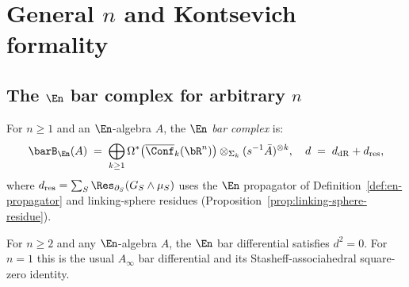 
\section{\texorpdfstring{General $n$ and Kontsevich formality}{General n and Kontsevich formality}}
\label{sec:general-n-formality}

\subsection{\texorpdfstring{The $\En$ bar complex for arbitrary $n$}{The En bar complex for arbitrary n}}

\begin{definition}
\label{def:en-bar-general}
For $n \geq 1$ and an $\En$-algebra $A$, the \emph{$\En$ bar complex}
is:
\begin{equation}\label{eq:en-bar-general}
\barB_{\En}(A)
\;=\;
\bigoplus_{k \geq 1}
\Omega^*\bigl(\overline{\Conf}_k(\bR^n)\bigr)
\otimes_{\Sigma_k} (s^{-1}\bar{A})^{\otimes k},
\quad
d \;=\; d_{\mathrm{dR}} + d_{\mathrm{res}},
\end{equation}
where $d_{\mathrm{res}} = \sum_S \Res_{\partial_S}(G_S \wedge \mu_S)$
uses the $\En$ propagator of Definition~\textup{\ref{def:en-propagator}}
and linking-sphere residues
\textup{(}Proposition~\textup{\ref{prop:linking-sphere-residue})}.
\end{definition}

\begin{theorem}[\texorpdfstring{$d^2 = 0$}{d squared = 0} for the \texorpdfstring{$\En$}{En} bar complex;
\ClaimStatusProvedElsewhere]
\label{thm:en-d-squared}
For $n \geq 2$ and any $\En$-algebra $A$, the $\En$ bar
differential satisfies $d^2 = 0$. For $n=1$ this is the usual
$A_\infty$ bar differential and its Stasheff-associahedral
square-zero identity.
\end{theorem}

